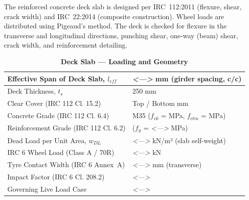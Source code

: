 \documentclass[12pt,a4paper]{report}
\numberwithin{table}{chapter}
\numberwithin{figure}{chapter}
\newcommand{\placeholder}[1]{\textit{\textless #1\textgreater}}
\begin{document}
The reinforced concrete deck slab is designed per IRC~112:2011 (flexure, shear, crack width) and IRC~22:2014 (composite construction). Wheel loads are distributed using Pigeaud's method. The deck is checked for flexure in the transverse and longitudinal directions, punching shear, one-way (beam) shear, crack width, and reinforcement detailing.

\vspace{1em}
\begin{longtable}{|L{5.5cm}|p{10.0cm}|}
\caption{\textbf{Deck Slab --- Loading and Geometry}}
\hline
\textnormal{Effective Span of Deck Slab, $l_{eff}$} & \placeholder{---} mm (girder spacing, c/c) \\[6pt]
\hline
\textnormal{Deck Thickness, $t_s$} & 250 mm \\[6pt]
\hline
\textnormal{Clear Cover (IRC 112 Cl. 15.2)} & Top  / Bottom  mm \\[6pt]
\hline
\textnormal{Concrete Grade (IRC 112 Cl. 6.4)} & M35 ($f_{ck}$ =  MPa, $f_{ctm}$ =  MPa) \\[6pt]
\hline
\textnormal{Reinforcement Grade (IRC 112 Cl. 6.2)} &  ($f_y$ = \placeholder{---} MPa) \\[6pt]
\hline
\textnormal{Dead Load per Unit Area, $w_{DL}$} & \placeholder{---} kN/m² (slab self-weight) \\[6pt]
\hline
\textnormal{IRC 6 Wheel Load (Class A / 70R)} & \placeholder{---} kN \\[6pt]
\hline
\textnormal{Tyre Contact Width (IRC 6 Annex~A)} & \placeholder{---} mm (transverse) \\[6pt]
\hline
\textnormal{Impact Factor (IRC 6 Cl. 208.2)} & \placeholder{---} \\[6pt]
\hline
\textnormal{Governing Live Load Case} & \placeholder{---} \\[6pt]
\hline
\end{longtable}
\end{document}
